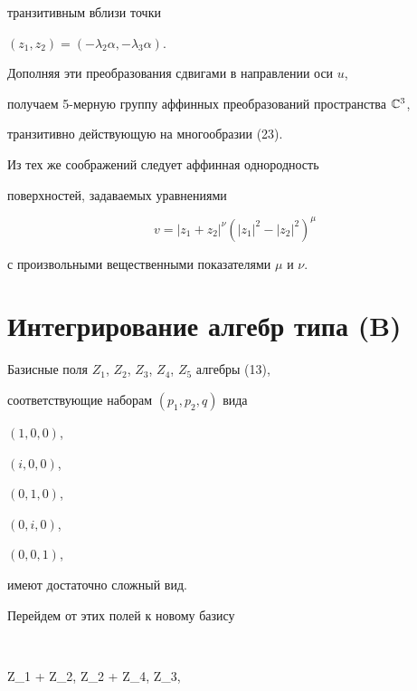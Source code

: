 транзитивным вблизи точки 


$ (z_1, z_2) = ( - \lambda_2 \alpha, - \lambda_3 \alpha ) $.





 Дополняя эти преобразования сдвигами в направлении оси $ u $, 


получаем 5-мерную группу аффинных преобразований пространства $ \Bbb C^3 $, 


транзитивно действующую на многообразии (23).





\begin{notenonum}


Из тех же соображений следует аффинная однородность 


поверхностей, задаваемых уравнениями 


$$


v = 


 | z_1 + z_2 |^{\nu}


\left( | z_1|^2 - | z_2 |^2 \right)^{\mu}


$$


с произвольными вещественными показателями $ \mu $ и $ \nu $. 


\end{notenonum}








\section{Интегрирование алгебр типа (B)}








Базисные поля $ Z_1$, $Z_2$, $Z_3$, $Z_4$, $Z_5 $ алгебры (13), 


соответствующие наборам $ (p_1,p_2,q) $ вида 


$ (1,0,0) $, 


$ (i,0,0) $, 


$ (0,1,0) $, 


$ (0,i,0) $, 


$ (0,0,1) $, 


имеют достаточно сложный вид. 


Перейдем от этих полей к новому базису


$$


 Z_1 + \beta Z_2, \quad \beta Z_2 + Z_4, \quad \alpha \beta Z_3, 


